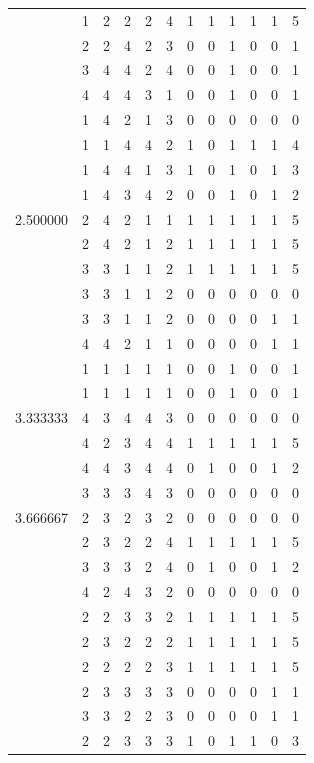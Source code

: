 \documentclass[]{book}
\theoremstyle{definition}
\theoremstyle{definition}
\theoremstyle{definition}
\theoremstyle{remark}
\begin{document}
\begin{table}
{\begin{tabular}[t]{rrrrrrrrrrrr}
 & 1 & 2 & 2 & 2 & 4 & 1 & 1 & 1 & 1 & 1 & 5\\
 & 2 & 2 & 4 & 2 & 3 & 0 & 0 & 1 & 0 & 0 & 1\\
 & 3 & 4 & 4 & 2 & 4 & 0 & 0 & 1 & 0 & 0 & 1\\
 & 4 & 4 & 4 & 3 & 1 & 0 & 0 & 1 & 0 & 0 & 1\\
 & 1 & 4 & 2 & 1 & 3 & 0 & 0 & 0 & 0 & 0 & 0\\
 & 1 & 1 & 4 & 4 & 2 & 1 & 0 & 1 & 1 & 1 & 4\\
 & 1 & 4 & 4 & 1 & 3 & 1 & 0 & 1 & 0 & 1 & 3\\
 & 1 & 4 & 3 & 4 & 2 & 0 & 0 & 1 & 0 & 1 & 2\\
2.500000 & 2 & 4 & 2 & 1 & 1 & 1 & 1 & 1 & 1 & 1 & 5\\
 & 2 & 4 & 2 & 1 & 2 & 1 & 1 & 1 & 1 & 1 & 5\\
 & 3 & 3 & 1 & 1 & 2 & 1 & 1 & 1 & 1 & 1 & 5\\
 & 3 & 3 & 1 & 1 & 2 & 0 & 0 & 0 & 0 & 0 & 0\\
 & 3 & 3 & 1 & 1 & 2 & 0 & 0 & 0 & 0 & 1 & 1\\
 & 4 & 4 & 2 & 1 & 1 & 0 & 0 & 0 & 0 & 1 & 1\\
 & 1 & 1 & 1 & 1 & 1 & 0 & 0 & 1 & 0 & 0 & 1\\
 & 1 & 1 & 1 & 1 & 1 & 0 & 0 & 1 & 0 & 0 & 1\\
3.333333 & 4 & 3 & 4 & 4 & 3 & 0 & 0 & 0 & 0 & 0 & 0\\
 & 4 & 2 & 3 & 4 & 4 & 1 & 1 & 1 & 1 & 1 & 5\\
 & 4 & 4 & 3 & 4 & 4 & 0 & 1 & 0 & 0 & 1 & 2\\
 & 3 & 3 & 3 & 4 & 3 & 0 & 0 & 0 & 0 & 0 & 0\\
3.666667 & 2 & 3 & 2 & 3 & 2 & 0 & 0 & 0 & 0 & 0 & 0\\
 & 2 & 3 & 2 & 2 & 4 & 1 & 1 & 1 & 1 & 1 & 5\\
 & 3 & 3 & 3 & 2 & 4 & 0 & 1 & 0 & 0 & 1 & 2\\
 & 4 & 2 & 4 & 3 & 2 & 0 & 0 & 0 & 0 & 0 & 0\\
 & 2 & 2 & 3 & 3 & 2 & 1 & 1 & 1 & 1 & 1 & 5\\
 & 2 & 3 & 2 & 2 & 2 & 1 & 1 & 1 & 1 & 1 & 5\\
 & 2 & 2 & 2 & 2 & 3 & 1 & 1 & 1 & 1 & 1 & 5\\
 & 2 & 3 & 3 & 3 & 3 & 0 & 0 & 0 & 0 & 1 & 1\\
 & 3 & 3 & 2 & 2 & 3 & 0 & 0 & 0 & 0 & 1 & 1\\
 & 2 & 2 & 3 & 3 & 3 & 1 & 0 & 1 & 1 & 0 & 3\\

\end{tabular}}
\end{table}
\end{document}
